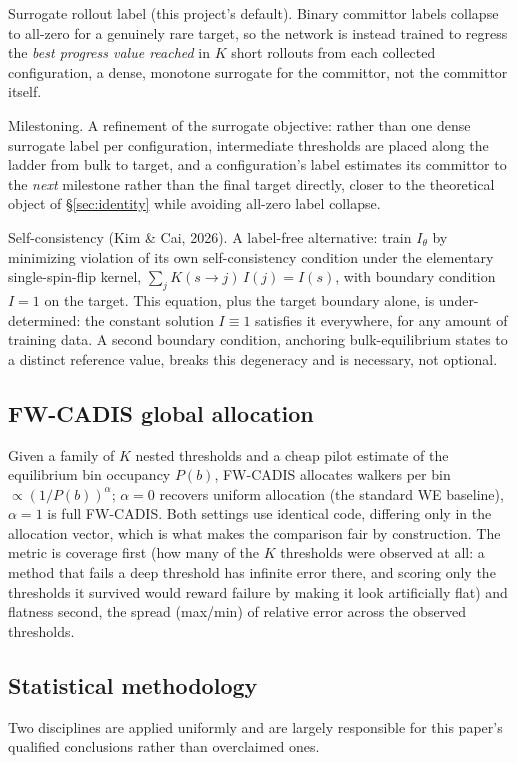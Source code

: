 \documentclass[11pt]{article}
\begin{document}
	Surrogate rollout label (this project's default). Binary committor labels collapse
	to all-zero for a genuinely rare target, so the network is instead trained to regress the
	\emph{best progress value reached} in $K$ short rollouts from each collected configuration,
	a dense, monotone surrogate for the committor, not the committor itself.

	Milestoning. A refinement of the surrogate objective: rather than one dense
	surrogate label per configuration, intermediate thresholds are placed along the ladder from
	bulk to target, and a configuration's label estimates its committor to the \emph{next}
	milestone rather than the final target directly, closer to the theoretical object of
	\S\ref{sec:identity} while avoiding all-zero label collapse.

	Self-consistency (Kim \& Cai, 2026). A label-free alternative: train $I_\theta$ by
	minimizing violation of its own self-consistency condition under the elementary
	single-spin-flip kernel, $\sum_j K(s\to j)\,I(j)=I(s)$, with boundary condition $I=1$ on the
	target. This equation, plus the target boundary alone, is under-determined: the constant
	solution $I\equiv1$ satisfies it everywhere, for any amount of training data. A second
	boundary condition, anchoring bulk-equilibrium states to a distinct reference value,
	breaks this degeneracy and is necessary, not optional.
	
	\subsection{FW-CADIS global allocation}
	Given a family of $K$ nested thresholds and a cheap pilot estimate of the equilibrium bin
	occupancy $P(b)$, FW-CADIS allocates walkers per bin $\propto (1/P(b))^\alpha$; $\alpha=0$
	recovers uniform allocation (the standard WE baseline), $\alpha=1$ is full FW-CADIS. Both
	settings use identical code, differing only in the allocation vector, which is what makes
	the comparison fair by construction. The metric is coverage first (how many of the
	$K$ thresholds were observed at all: a method that fails a deep threshold has infinite
	error there, and scoring only the thresholds it survived would reward failure by making it
	look artificially flat) and flatness second, the spread (max/min) of relative error
	across the observed thresholds.
	
	\subsection{Statistical methodology}
	Two disciplines are applied uniformly and are largely responsible for this paper's
	qualified conclusions rather than overclaimed ones.
	
\end{document}

